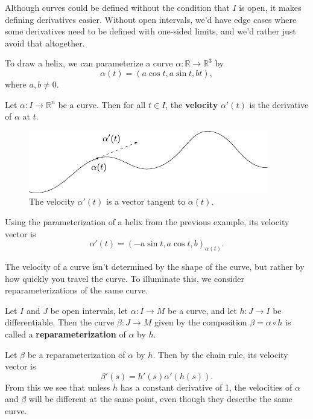 \documentclass[10pt]{report}
\begin{document}
Although curves could be defined without the condition that $I$ is open, it makes defining derivatives easier. Without open intervals, we'd have edge cases where some derivatives need to be defined with one-sided limits, and we'd rather just avoid that altogether.
\pagebreak

\begin{ex}
	To draw a helix, we can parameterize a curve $\alpha:\mathbb{R}\to \mathbb{R}^3$ by 
	\[
		\alpha(t)=(a \cos t, a \sin t, bt),
	\] where $a, b\neq 0$.
\end{ex}

\begin{defn}
	Let $\alpha:I\to \mathbb{R}^n$ be a curve. Then for all $t \in I$, the \textbf{velocity} $\alpha'(t)$ is the derivative of $\alpha$ at $t$.
\end{defn}

\begin{figure}[H]
	\centering
	\includegraphics[scale=1]{fig/velocity.pdf}
	\caption{The velocity $\alpha'(t)$ is a vector tangent to $\alpha(t)$.}
\end{figure}

\begin{ex}
Using the parameterization of a helix from the previous example, its velocity vector is
\[
	\alpha'(t) = (-a \sin t, a \cos t, b)_{\alpha(t)}.
\]
\end{ex}

The velocity of a curve isn't determined by the shape of the curve, but rather by how quickly you travel the curve. To illuminate this, we consider reparameterizations of the same curve.

\begin{defn}
	Let $I$ and $J$ be open intervals, let $\alpha:I\to M$ be a curve, and let $h:J\to I$ be differentiable. Then the curve $\beta:J\to M$ given by the composition $\beta = \alpha \circ h$ is called a \textbf{reparameterization} of $\alpha$ by $h$.
\end{defn}

Let $\beta$ be a reparameterization of $\alpha$ by $h$. Then by the chain rule, its velocity vector is
\[
	\beta'(s) = h'(s) \alpha'(h(s)).
\] 
From this we see that unless $h$ has a constant derivative of 1, the velocities of $\alpha$ and $\beta$ will be different at the same point, even though they describe the same curve.
\end{document}
